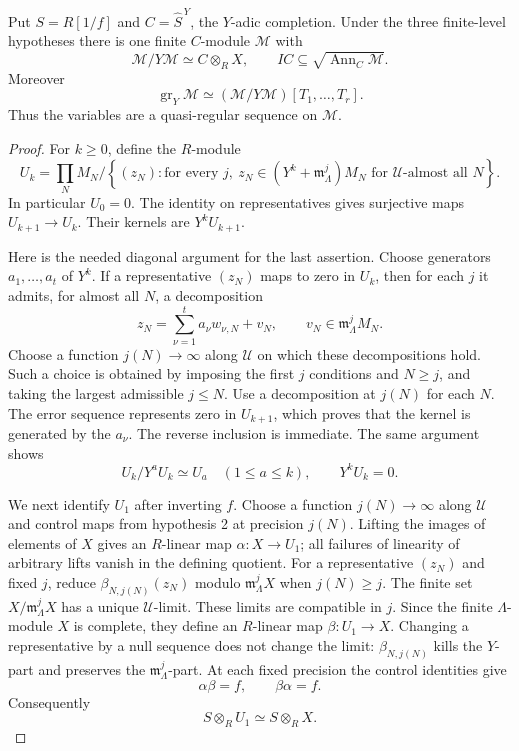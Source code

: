 \begin{srproposition}\label{prop:sr-one-patched-module}
Put $S=R[1/f]$ and $C=\widehat S^{\,Y}$, the $Y$-adic completion.
Under the three finite-level hypotheses there is one finite
$C$-module $\mathcal M$ with
\begin{equation}\label{eq:sr-patched-fiber}
 \mathcal M/Y\mathcal M\simeq C\otimes_R X,\qquad
 I C\subseteq\sqrt{\operatorname{Ann}_C\mathcal M}.
\end{equation}
Moreover
\begin{equation}\label{eq:sr-patched-gr}
 \operatorname{gr}_Y\mathcal M
           \simeq(\mathcal M/Y\mathcal M)[T_1,\ldots,T_r].
\end{equation}
Thus the variables are a quasi-regular sequence on $\mathcal M$.
\end{srproposition}
\begin{proof}
For $k\ge0$, define the $R$-module
\[
 U_k=\prod_N M_N\big/
 \left\{(z_N):
    \text{for every }j,\ 
     z_N\in(Y^k+\mathfrak m_\Lambda^j)M_N
                  \text{ for }\mathcal U\text{-almost all }N\right\}.
\]
In particular $U_0=0$.
The identity on representatives gives surjective maps
$U_{k+1}\to U_k$. Their kernels are $Y^kU_{k+1}$.

Here is the needed diagonal argument for the last assertion.
Choose generators $a_1,\ldots,a_t$ of $Y^k$.
If a representative $(z_N)$ maps to zero in $U_k$, then for each
$j$ it admits, for almost all $N$, a decomposition
\[
       z_N=\sum_{\nu=1}^t a_\nu w_{\nu,N}+v_N,
                          \qquad v_N\in\mathfrak m_\Lambda^jM_N.
\]
Choose a function $j(N)\to\infty$ along $\mathcal U$ on which these
decompositions hold. Such a choice is obtained by imposing the first
$j$ conditions and $N\ge j$, and taking the largest admissible
$j\le N$. Use a decomposition at $j(N)$ for each $N$.
The error sequence represents zero in $U_{k+1}$, which proves that
the kernel is generated by the $a_\nu$.
The reverse inclusion is immediate.
The same argument shows
\[
 U_k/Y^aU_k\simeq U_a\quad(1\le a\le k),\qquad Y^kU_k=0.
\]

We next identify $U_1$ after inverting $f$.
Choose a function $j(N)\to\infty$ along $\mathcal U$ and control maps
from hypothesis 2 at precision $j(N)$.
Lifting the images of elements of $X$ gives an $R$-linear map
$\alpha:X\to U_1$; all failures of linearity of arbitrary lifts vanish
in the defining quotient.
For a representative $(z_N)$ and fixed $j$, reduce
$\beta_{N,j(N)}(z_N)$ modulo $\mathfrak m_\Lambda^jX$ when
$j(N)\ge j$. The finite set $X/\mathfrak m_\Lambda^jX$ has a unique
$\mathcal U$-limit. These limits are compatible in $j$.
Since the finite $\Lambda$-module $X$ is complete, they define an
$R$-linear map $\beta:U_1\to X$.
Changing a representative by a null sequence does not change the limit:
$\beta_{N,j(N)}$ kills the $Y$-part and preserves the
$\mathfrak m_\Lambda^j$-part.
At each fixed precision the control identities give
\[
                      \alpha\beta=f,\qquad\beta\alpha=f.
\]
Consequently
\[
                         S\otimes_R U_1\simeq S\otimes_R X.
\]


\end{proof}

